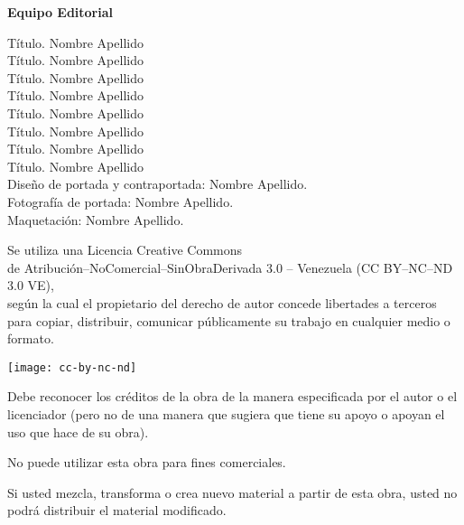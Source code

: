 \begin{footnotesize}
	\textbf{Equipo Editorial}
	
	Título. Nombre Apellido\\
	Título. Nombre Apellido\\
	Título. Nombre Apellido\\
	Título. Nombre Apellido\\
	Título. Nombre Apellido\\
	Título. Nombre Apellido\\
	Título. Nombre Apellido\\
	Título. Nombre Apellido\\

	Diseño de portada y contraportada: Nombre Apellido.\\
	Fotografía de portada: Nombre Apellido.\\
	Maquetación: Nombre Apellido.\\
\end{footnotesize}
	
\begin{scriptsize}
	\begin{center}
	Se utiliza una Licencia Creative Commons \\de Atribución--NoComercial--SinObraDerivada 3.0 -- Venezuela (CC
	BY--NC--ND 3.0 VE), \\según la cual el propietario del derecho de autor concede libertades a terceros para copiar, distribuir, comunicar públicamente su trabajo en cualquier medio o formato.
	\end{center}
	
	\begin{center}
	\texttt{[image: cc-by-nc-nd]}
	\end{center}
	
	\begin{description}[style=multiline,leftmargin=3cm]
	\item[Atribución]Debe reconocer los créditos de la obra de la manera especificada por el autor o el licenciador (pero no de una manera que sugiera que tiene su apoyo o apoyan el uso que hace de su obra).
	\item[No comercial]No puede utilizar esta obra para fines comerciales.
	\item[Sin obra derivada]Si usted mezcla, transforma o crea nuevo material a partir de esta obra, usted no podrá distribuir el material modificado.
	\end{description}
\end{scriptsize}